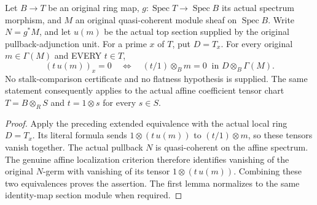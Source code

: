 \begin{theorem}
\label{thm:affine-pullback-stalk-tensor-readback}
\leanok
{}
Let $B\to T$ be an original ring map, $g:\operatorname{Spec}T\to
\operatorname{Spec}B$ its actual spectrum morphism, and $M$ an original
quasi-coherent module sheaf on $\operatorname{Spec}B$. Write $N=g^*M$,
and let $u(m)$ be the actual top section supplied by the original
pullback-adjunction unit. For a prime $x$ of $T$, put $D=T_x$.
For every original $m\in\Gamma(M)$ and EVERY $t\in T$,
\[
 (t\,u(m))_x=0\quad\Longleftrightarrow\quad
 (t/1)\otimes_B m=0\ \text{ in }D\otimes_B\Gamma(M).
\]
No stalk-comparison certificate and no flatness hypothesis is supplied.
The same statement consequently applies to the actual affine coefficient
tensor chart $T=B\otimes_R S$ and $t=1\otimes s$ for every $s\in S$.
\end{theorem}
\begin{proof}
Apply the preceding extended equivalence with the actual local ring
$D=T_x$. Its literal formula sends $1\otimes(t\,u(m))$ to
$(t/1)\otimes m$, so these tensors vanish together. The actual pullback
$N$ is quasi-coherent on the affine spectrum. The genuine affine
localization criterion therefore identifies vanishing of the original
$N$-germ with vanishing of its tensor $1\otimes(t\,u(m))$.
Combining these two equivalences proves the assertion. The first lemma
normalizes to the same identity-map section module when required.
\end{proof}
